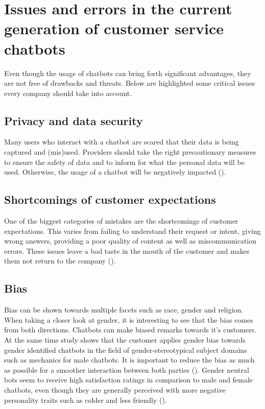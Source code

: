 \section{Issues and errors in the current generation of customer service chatbots}
Even though the usage of chatbots can bring forth significant advantages, they are not free of drawbacks and threats. Below are highlighted some critical issues every company should take into account.

\subsection{Privacy and data security}
Many users who interact with a chatbot are scared that their data is being captured and (mis)used. Providers should take the right precautionary measures to ensure the safety of data and to inform for what the personal data will be used. Otherwise, the usage of a chatbot will be negatively impacted (\cite{Adamopoulou2020, Duka2021, Rese2020}).

\subsection{Shortcomings of customer expectations}
One of the biggest categories of mistakes are the shortcomings of customer expectations. This varies from failing to understand their request or intent, giving wrong answers, providing a poor quality of content as well as miscommunication errors. These issues leave a bad taste in the mouth of the customer and makes them not return to the company (\cite{Adamopoulou2020, Duka2021, Nichifor2021, Sheehan2020, Margot}).

\subsection{Bias}
Bias can be shown towards multiple facets such as race, gender and religion. When taking a closer look at gender, it is interesting to see that the bias comes from both directions. Chatbots can make biased remarks towards it's customers. At the same time study shows that the customer applies gender bias towards gender identified chatbots in the field of gender-stereotypical subject domains such as mechanics for male chatbots. It is important to reduce the bias as much as possible for a smoother interaction between both parties (\cite{Adamopoulou2020, McDonnell2019}). Gender neutral bots seem to receive high satisfaction ratings in comparison to male and female chatbots, even though they are generally perceived with more negative personality traits such as colder and less friendly (\cite{McDonnell2019}).

